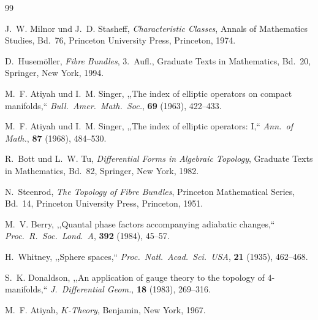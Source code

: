 \documentclass[12pt,a4paper]{amsart}
\theoremstyle{definition}
\begin{document}
\begin{thebibliography}{99}

J.~W. Milnor und J.~D. Stasheff,
\textit{Characteristic Classes},
Annals of Mathematics Studies, Bd.~76,
Princeton University Press, Princeton, 1974.

D.~Husem\"{o}ller,
\textit{Fibre Bundles},
3.\ Aufl., Graduate Texts in Mathematics, Bd.~20,
Springer, New York, 1994.

M.~F. Atiyah und I.~M. Singer,
,,The index of elliptic operators on compact manifolds,``
\textit{Bull.\ Amer.\ Math.\ Soc.}, \textbf{69} (1963), 422--433.

M.~F. Atiyah und I.~M. Singer,
,,The index of elliptic operators: I,``
\textit{Ann.\ of Math.}, \textbf{87} (1968), 484--530.

R.~Bott und L.~W. Tu,
\textit{Differential Forms in Algebraic Topology},
Graduate Texts in Mathematics, Bd.~82,
Springer, New York, 1982.

N.~Steenrod,
\textit{The Topology of Fibre Bundles},
Princeton Mathematical Series, Bd.~14,
Princeton University Press, Princeton, 1951.

M.~V. Berry,
,,Quantal phase factors accompanying adiabatic changes,``
\textit{Proc.\ R.\ Soc.\ Lond.\ A}, \textbf{392} (1984), 45--57.

H.~Whitney,
,,Sphere spaces,``
\textit{Proc.\ Natl.\ Acad.\ Sci.\ USA}, \textbf{21} (1935), 462--468.

S.~K. Donaldson,
,,An application of gauge theory to the topology of $4$-manifolds,``
\textit{J.\ Differential Geom.}, \textbf{18} (1983), 269--316.

M.~F. Atiyah,
\textit{$K$-Theory},
Benjamin, New York, 1967.

\end{thebibliography}
\end{document}
